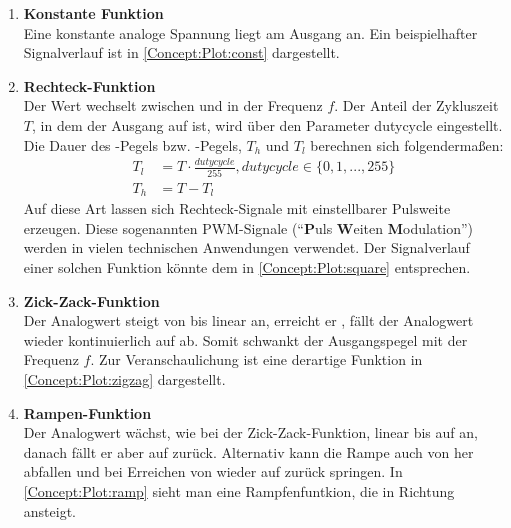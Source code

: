 \begin{enumerate}
   \item \textbf{Konstante Funktion} \\ 
    Eine konstante analoge Spannung  liegt am Ausgang an.
    Ein beispielhafter Signalverlauf ist in \cref{Concept:Plot:const} dargestellt.
  \item \textbf{Rechteck-Funktion} \\
    Der Wert wechselt zwischen  und  in der Frequenz $f$.
    Der Anteil der Zykluszeit $T$, in dem der Ausgang auf  ist, wird über den Parameter dutycycle eingestellt.
    Die Dauer des -Pegels bzw. -Pegels, $T_{h}$ und $T_{l}$ berechnen sich folgendermaßen:
    \begin{align}
      T_{l} &= T \cdot \frac{dutycycle}{255}, dutycycle \in \{0, 1, ..., 255\} \label{Concept:Feature:Func:eqdc1} \\
      T_{h} &= T - T_{l} \label{Concept:Feature:Func:eqdc2}
    \end{align}
    Auf diese Art lassen sich Rechteck-Signale mit einstellbarer Pulsweite erzeugen.
    Diese sogenannten PWM-Signale (``\textbf{P}uls \textbf{W}eiten \textbf{M}odulation'') werden in vielen technischen Anwendungen verwendet.
    Der Signalverlauf einer solchen Funktion könnte dem in \cref{Concept:Plot:square} entsprechen.
  \item \textbf{Zick-Zack-Funktion} \\
    Der Analogwert steigt von  bis  linear an, erreicht er , fällt der Analogwert wieder kontinuierlich auf  ab.
    Somit schwankt der Ausgangspegel mit der Frequenz $f$.
    Zur Veranschaulichung ist eine derartige Funktion in \cref{Concept:Plot:zigzag} dargestellt.
  \item \textbf{Rampen-Funktion} \\
    Der Analogwert wächst, wie bei der Zick-Zack-Funktion, linear bis auf  an, danach fällt er aber auf  zurück.
    Alternativ kann die Rampe auch von  her abfallen und bei Erreichen von  wieder auf  zurück springen.
    In \cref{Concept:Plot:ramp} sieht man eine Rampfenfuntkion, die in Richtung  ansteigt.
\end{enumerate}

